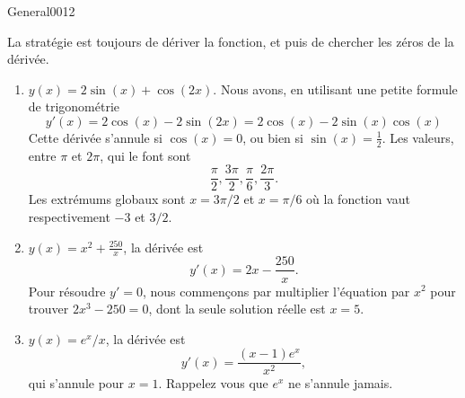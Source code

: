 \begin{corrige}{General0012}

La stratégie est toujours de dériver la fonction, et puis de chercher les zéros de la dérivée.

\begin{enumerate}

\item
$y(x)=2\sin(x)+\cos(2x)$. Nous avons, en utilisant une petite formule de trigonométrie 
\begin{equation}
	y'(x)=2\cos(x)-2\sin(2x)=2\cos(x)-2\sin(x)\cos(x)
\end{equation}
Cette dérivée s'annule si $\cos(x)=0$, ou bien si $\sin(x)=\frac{ 1 }{2}$. Les valeurs, entre $\pi$ et $2\pi$, qui le font sont
\begin{equation}
	\frac{ \pi }{ 2 },\frac{ 3\pi }{2},\frac{ \pi }{ 6 },\frac{ 2\pi }{ 3 }.
\end{equation}
Les extrémums globaux sont $x=3\pi/2$ et $x=\pi/6$ où la fonction vaut respectivement $-3$ et $3/2$.

\item
$y(x)=x^2+\frac{ 250 }{ x }$, la dérivée est
\begin{equation}
	y'(x)=2x-\frac{ 250 }{ x }.
\end{equation}
Pour résoudre $y'=0$, nous commençons par multiplier l'équation par $x^2$ pour trouver $2x^3-250=0$, dont la seule solution réelle est $x=5$.

\item
$y(x)=e^x/x$, la dérivée est
\begin{equation}
	y'(x)=\frac{ (x-1) e^{x} }{ x^2 },
\end{equation}
qui s'annule pour $x=1$. Rappelez vous que $e^x$ ne s'annule jamais.
\end{enumerate}


\end{corrige}
